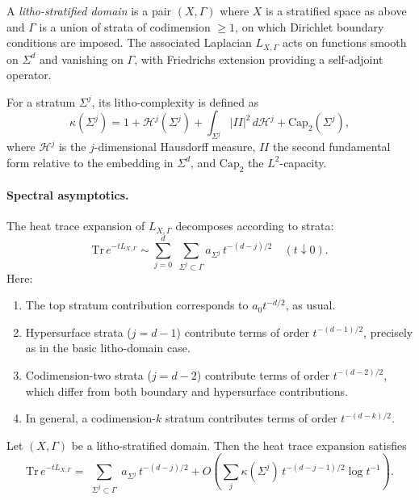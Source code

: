 \begin{definition}\label{def:lithostrat}
A \emph{litho-stratified domain} is a pair $(X,\Gamma)$
where $X$ is a stratified space as above and $\Gamma$ is a
union of strata of codimension $\ge 1$,
on which Dirichlet boundary conditions are imposed.
The associated Laplacian $L_{X,\Gamma}$ acts on functions
smooth on $\Sigma^d$ and vanishing on $\Gamma$,
with Friedrichs extension providing a self-adjoint operator.
\end{definition}

\begin{definition}
For a stratum $\Sigma^j$, its litho-complexity is defined as
\[
\kappa(\Sigma^j) = 1 + \mathcal{H}^j(\Sigma^j) + \int_{\Sigma^j} |II|^2 \, d\mathcal{H}^j + \mathrm{Cap}_{2}(\Sigma^j),
\]
where $\mathcal{H}^j$ is the $j$-dimensional Hausdorff measure,
$II$ the second fundamental form relative to the embedding in $\Sigma^d$,
and $\mathrm{Cap}_2$ the $L^2$-capacity.
\end{definition}

\paragraph{Spectral asymptotics.}
The heat trace expansion of $L_{X,\Gamma}$ decomposes according to strata:
\[
\mathrm{Tr}\,e^{-tL_{X,\Gamma}}
\sim \sum_{j=0}^d \; \sum_{\Sigma^j\subset \Gamma} a_{\Sigma^j}\, t^{-(d-j)/2} \quad (t\downarrow 0).
\]
Here:
\begin{enumerate}
\item The top stratum contribution corresponds to $a_0 t^{-d/2}$, as usual.
\item Hypersurface strata ($j=d-1$) contribute terms of order $t^{-(d-1)/2}$,
precisely as in the basic litho-domain case.
\item Codimension-two strata ($j=d-2$) contribute terms of order $t^{-(d-2)/2}$,
which differ from both boundary and hypersurface contributions.
\item In general, a codimension-$k$ stratum contributes terms of order $t^{-(d-k)/2}$.
\end{enumerate}

\begin{theorem}\label{thm:strat}
Let $(X,\Gamma)$ be a litho-stratified domain.
Then the heat trace expansion satisfies
\[
\mathrm{Tr}\,e^{-tL_{X,\Gamma}} =
\sum_{\substack{\Sigma^j\subset \Gamma}} a_{\Sigma^j}\, t^{-(d-j)/2}
+ O\!\left(\sum_{j} \kappa(\Sigma^j)\, t^{-(d-j-1)/2}\log t^{-1}\right).
\]
\end{theorem}

